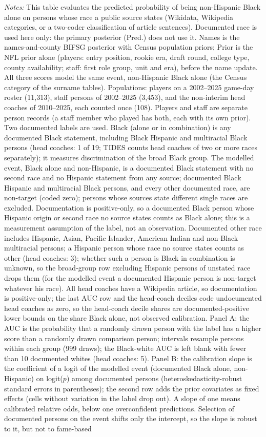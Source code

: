 {\footnotesize
\noindent\textit{Notes:} This table evaluates the predicted probability of being non-Hispanic Black alone on persons whose race a public source states (Wikidata, Wikipedia categories, or a two-coder classification of article sentences). Documented race is used here only: the primary posterior (Pred.) does not use it. Names is the names-and-county BIFSG posterior with Census population priors; Prior is the NFL prior alone (players: entry position, rookie era, draft round, college type, county availability; staff: first role group, unit and era), before the name update. All three scores model the same event, non-Hispanic Black alone (the Census category of the surname tables). Populations: players on a 2002--2025 game-day roster (11,313), staff persons of 2002--2025 (3,453), and the non-interim head coaches of 2010--2025, each counted once (108). Players and staff are separate person records (a staff member who played has both, each with its own prior). Two documented labels are used. Black (alone or in combination) is any documented Black statement, including Black Hispanic and multiracial Black persons (head coaches: 1 of 19; TIDES counts head coaches of two or more races separately); it measures discrimination of the broad Black group. The modelled event, Black alone and non-Hispanic, is a documented Black statement with no second race and no Hispanic statement from any source; documented Black Hispanic and multiracial Black persons, and every other documented race, are non-target (coded zero); persons whose sources state different single races are excluded. Documentation is positive-only, so a documented Black person whose Hispanic origin or second race no source states counts as Black alone; this is a measurement assumption of the label, not an observation. Documented other race includes Hispanic, Asian, Pacific Islander, American Indian and non-Black multiracial persons; a Hispanic person whose race no source states counts as other (head coaches: 3); whether such a person is Black in combination is unknown, so the broad-group row excluding Hispanic persons of unstated race drops them (for the modelled event a documented Hispanic person is non-target whatever his race). All head coaches have a Wikipedia article, so documentation is positive-only; the last AUC row and the head-coach deciles code undocumented head coaches as zero, so the head-coach decile shares are documented-positive lower bounds on the share Black alone, not observed calibration. Panel A: the AUC is the probability that a randomly drawn person with the label has a higher score than a randomly drawn comparison person; intervals resample persons within each group (999 draws); the Black-white AUC is left blank with fewer than 10 documented whites (head coaches: 5). Panel B: the calibration slope is the coefficient of a logit of the modelled event (documented Black alone, non-Hispanic) on logit($p$) among documented persons (heteroskedasticity-robust standard errors in parentheses); the second row adds the prior covariates as fixed effects (cells without variation in the label drop out). A slope of one means calibrated relative odds, below one overconfident predictions. Selection of documented persons on the event shifts only the intercept, so the slope is robust to it, but not to fame-based }
